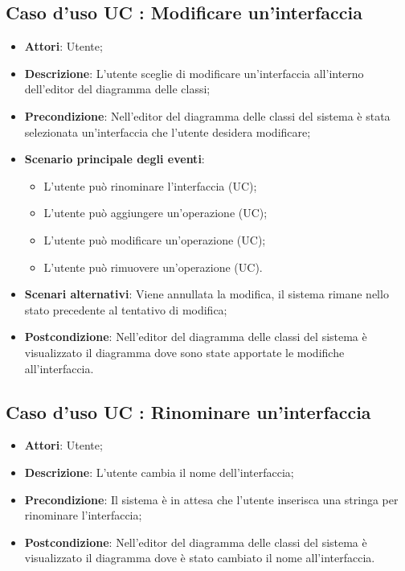 \documentclass[../AnalisiDeiRequisiti.tex]{subfiles}
\begin{document}
			\subsection{Caso d'uso UC : Modificare un'interfaccia}
			\begin{itemize}
				\item \textbf{Attori}: Utente;
				\item \textbf{Descrizione}: L'utente sceglie di modificare un'interfaccia
				all'interno dell'editor del diagramma delle classi;
				\item \textbf{Precondizione}: Nell'editor del diagramma delle classi del
				sistema è stata selezionata un'interfaccia che l'utente desidera modificare;
				\item \textbf{Scenario principale degli eventi}:
				\begin{itemize}
					\item L'utente può rinominare l'interfaccia (UC);
					\item L'utente può aggiungere un'operazione (UC);
					\item L'utente può modificare un'operazione (UC);
					\item L'utente può rimuovere un'operazione (UC).
				\end{itemize}
				\item \textbf{Scenari alternativi}: Viene annullata la modifica, il sistema
				rimane nello stato precedente al tentativo di modifica;
				\item \textbf{Postcondizione}: Nell'editor del diagramma delle classi del
				sistema è visualizzato il diagramma dove sono state apportate le modifiche
				all'interfaccia.
			\end{itemize}
			\subsection{Caso d'uso UC : Rinominare un'interfaccia}
			\begin{itemize}
				\item \textbf{Attori}: Utente;
				\item \textbf{Descrizione}: L'utente cambia il nome dell'interfaccia;
				\item \textbf{Precondizione}: Il sistema è in attesa che l'utente inserisca
				una stringa per rinominare l'interfaccia;
				\item \textbf{Postcondizione}: Nell'editor del diagramma delle classi del
				sistema è visualizzato il diagramma dove è stato cambiato il nome
				all'interfaccia.
			\end{itemize}
		
\end{document}
